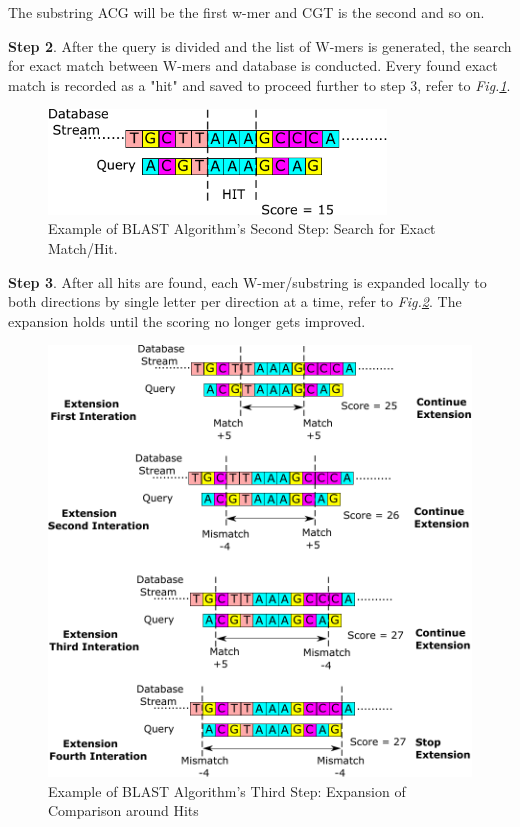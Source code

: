 The substring ACG will be the first w-mer and CGT is the second and so on. 



\textbf{Step 2}. After the query is divided and the list of W-mers is generated, the search for exact match between W-mers and database is conducted. Every found exact match is recorded as a "hit" and saved to proceed further to step 3, refer to \textit{Fig.\ref{fig:step2}}. 

\begin{figure}[h!]
\centering
\includegraphics[width=0.8\textwidth]{Figures/Algorithm2.pdf}
\caption{Example of BLAST Algorithm's Second Step: Search for Exact Match/Hit.} \label{fig:step2}
\end{figure}



\textbf{Step 3}. After all hits are found, each W-mer/substring is expanded locally to both directions by single letter per direction at a time, refer to \textit{Fig.\ref{fig:step3}}. The expansion holds until the scoring no longer gets improved.
\\


\begin{figure}[h!]
\centering
\includegraphics[width=\textwidth]{Figures/Algorithm3.pdf}
\caption{Example of BLAST Algorithm's Third Step: Expansion of Comparison around Hits} \label{fig:step3}
\end{figure}



